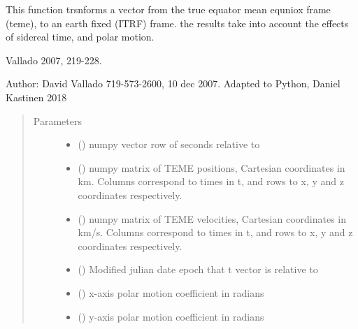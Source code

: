 \documentclass[letterpaper,10pt,english]{sphinxmanual}
\begin{document}
\begin{fulllineitems}
\label{\detokenize{modules/propagator_sgp4:propagator_sgp4.teme2ecef}}
This function trsnforms a vector from the true equator mean equniox frame
(teme), to an earth fixed (ITRF) frame.  the results take into account
the effects of sidereal time, and polar motion.

 Vallado  2007, 219-228.

Author: David Vallado 719-573-2600, 10 dec 2007.
Adapted to Python, Daniel Kastinen 2018
\begin{quote}\begin{description}
\item[{Parameters}] \leavevmode\begin{itemize}
\item {} 
 () \textendash{} numpy vector row of seconds relative to 

\item {} 
 () \textendash{} numpy matrix of TEME positions, Cartesian coordinates in km. Columns correspond to times in t, and rows to x, y and z coordinates respectively.

\item {} 
 () \textendash{} numpy matrix of TEME velocities, Cartesian coordinates in km/s. Columns correspond to times in t, and rows to x, y and z coordinates respectively.

\item {} 
 () \textendash{} Modified julian date epoch that t vector is relative to

\item {} 
 () \textendash{} x-axis polar motion coefficient in radians

\item {} 
 () \textendash{} y-axis polar motion coefficient in radians


\end{itemize}
\end{description}
\end{quote}
\end{fulllineitems}
\end{document}
